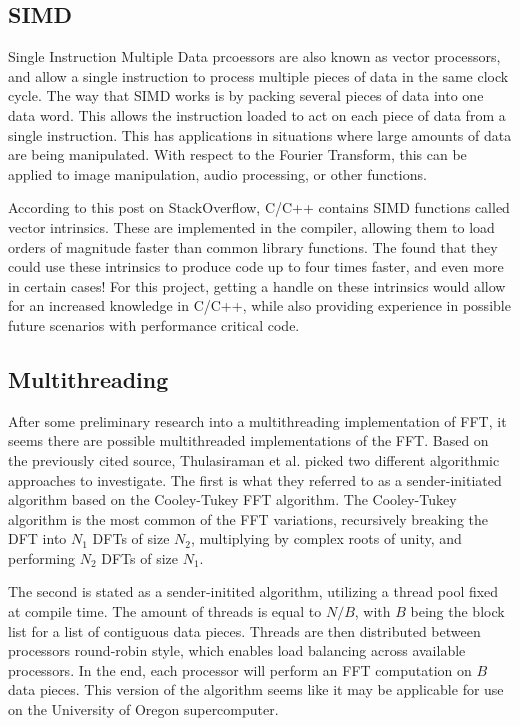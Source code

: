 \documentclass[12pt]{extarticle}
\begin{document}
\subsection*{SIMD}
    
    Single Instruction Multiple Data prcoessors are also known as vector processors, and allow a single instruction
    to process multiple pieces of data in the same clock cycle. The way that SIMD works is by packing several pieces of data
    into one data word. This allows the instruction loaded to act on each piece of data from a single instruction.
    This has applications in situations where large amounts of data are being manipulated. With respect to the Fourier Transform,
    this can be applied to image manipulation, audio processing, or other functions.

    According to this post\cite{Konstantin:2020} on StackOverflow, C/C++ contains SIMD functions called vector intrinsics.
    These are implemented in the compiler, allowing them to load orders of magnitude faster than common library functions. 
    The found that they could use these intrinsics to produce code up to four times faster, and even more in certain cases!
    For this project, getting a handle on these intrinsics would allow for an increased knowledge in C/C++, while also providing
    experience in possible future scenarios with performance critical code.

\subsection*{Multithreading}
    After some preliminary research into a multithreading implementation of FFT\cite{Thulasiraman:2021}, it seems there are
    possible multithreaded implementations of the FFT. Based on the previously cited source, Thulasiraman et al. picked two 
    different algorithmic approaches to investigate. The first is what they referred to as a sender-initiated algorithm based
    on the Cooley-Tukey FFT algorithm. The Cooley-Tukey algorithm is the most common of the FFT variations, recursively breaking
    the DFT into $N_1$ DFTs of size $N_2$, multiplying by complex roots of unity, and performing $N_2$ DFTs of size $N_1$.
    
    The second is stated as a sender-initited algorithm, utilizing a thread pool fixed at compile time. 
    The amount of threads is equal to $N/B$, with $B$ being the block list for a list of contiguous data pieces. 
    Threads are then distributed between processors round-robin style, which enables load balancing across available processors.
    In the end, each processor will perform an FFT computation on $B$ data pieces.
    This version of the algorithm seems like it may be applicable for use on the University of Oregon supercomputer.
\end{document}
